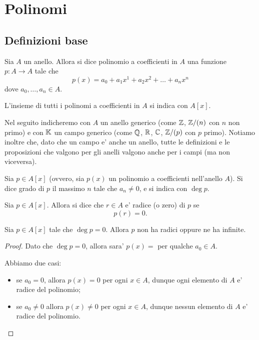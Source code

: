 \chapter{Polinomi}

\section{Definizioni base}

\begin{definition}
    Sia $A$ un anello. Allora si dice polinomio a coefficienti in $A$ una funzione $p : A \to A$ tale che \begin{equation}
        p(x) = a_0 + a_1x^1 + a_2x^2+ \dots + a_nx^n
    \end{equation}
    dove $a_0, \dots, a_n \in A$.

    L'insieme di tutti i polinomi a coefficienti in $A$ si indica con $A[x]$.
\end{definition}

Nel seguito indicheremo con $A$ un anello generico (come $\mathbb{Z}$, $\mathbb{Z}/(n)$ con $n$ non primo) e con $\mathbb{K}$ un campo generico (come $\mathbb{Q}$, $\mathbb{R}$, $\mathbb{C}$, $\mathbb{Z}/(p)$ con $p$ primo). Notiamo inoltre che, dato che un campo e' anche un anello, tutte le definizioni e le proposizioni che valgono per gli anelli valgono anche per i campi (ma non viceversa).

\begin{definition}
    Sia $p \in A[x]$ (ovvero, sia $p(x)$ un polinomio a coefficienti nell'anello $A$). Si dice grado di $p$ il massimo $n$ tale che $a_n \neq 0$, e si indica con $\deg p$.
\end{definition}

\begin{definition}
    Sia $p \in A[x]$. Allora si dice che $r \in A$ e' radice (o zero) di $p$ se \begin{equation}
        p(r) = 0.
    \end{equation}
\end{definition}

\begin{proposition}
    Sia $p \in A[x]$ tale che $\deg p = 0$. Allora $p$ non ha radici oppure ne ha infinite.
\end{proposition}
\begin{proof}
    Dato che $\deg p = 0$, allora sara' $p(x) = $ per qualche $a_0 \in A$.

    Abbiamo due casi: \begin{itemize}
        \item se $a_0 = 0$, allora $p(x) = 0$ per ogni $x \in A$, dunque ogni elemento di $A$ e' radice del polinomio;
        \item se $a_0 \neq 0$ allora $p(x) \neq 0$ per ogni $x \in A$, dunque nessun elemento di $A$ e' radice del polinomio. \qedhere
    \end{itemize}
\end{proof}



